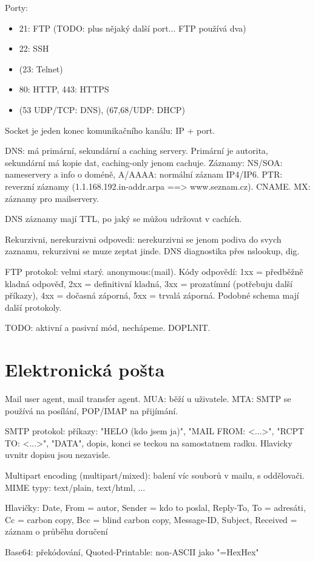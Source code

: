 \documentclass[a4paper,10pt,titlepage]{article} \usepackage[utf8]{inputenc}
\begin{document}
Porty:
\begin{itemize}
\item 21: FTP (TODO: plus nějaký další port... FTP používá dva)
\item 22: SSH
\item (23: Telnet)
\item 80: HTTP, 443: HTTPS
\item (53 UDP/TCP: DNS), (67,68/UDP: DHCP)
\end{itemize}

Socket je jeden konec komunikačního kanálu: IP + port.

DNS: má primární, sekundární a caching servery. Primární je autorita,
sekundární má kopie dat, caching-only jenom cachuje.
Záznamy: NS/SOA: nameservery a info o doméně, A/AAAA: normální záznam IP4/IP6.
PTR: reverzní záznamy (1.1.168.192.in-addr.arpa ==> www.seznam.cz). CNAME.
MX: záznamy pro mailservery.

DNS záznamy mají TTL, po jaký se můžou udržovat v cachích.

Rekurzivni, nerekurzivni odpovedi: nerekurzivni se jenom podiva do svych
zaznamu, rekurzivni se muze zeptat jinde.
DNS diagnostika přes nslookup, dig.

FTP protokol: velmi starý. anonymous:(mail).
Kódy odpovědí: 1xx = předběžně kladná odpověď, 2xx = definitivní kladná,
3xx = prozatímní (potřebuju další příkazy), 4xx = dočasná záporná, 5xx = trvalá
záporná. Podobné schema mají další protokoly.

TODO: aktivní a pasivní mód, nechápeme. DOPLNIT.

\section{Elektronická pošta}
Mail user agent, mail transfer agent.
MUA: běží u uživatele. MTA: SMTP se používá na posílání, POP/IMAP na přijímání.

SMTP protokol: příkazy: "HELO (kdo jsem ja)", "MAIL FROM: <...>", "RCPT TO:
<...>", "DATA", dopis, konci se teckou na samostatnem radku.
Hlavicky uvnitr dopisu jsou nezavisle.

Multipart encoding (multipart/mixed): balení víc souborů v mailu, s oddělovači.
MIME typy: text/plain, text/html, ...

Hlavičky: Date, From = autor, Sender = kdo to poslal, Reply-To, To = adresáti,
Cc = carbon copy, Bcc = blind carbon copy, Message-ID, Subject, Received =
záznam o průběhu doručení

Base64: překódování, Quoted-Printable: non-ASCII jako "=HexHex"
\end{document}
